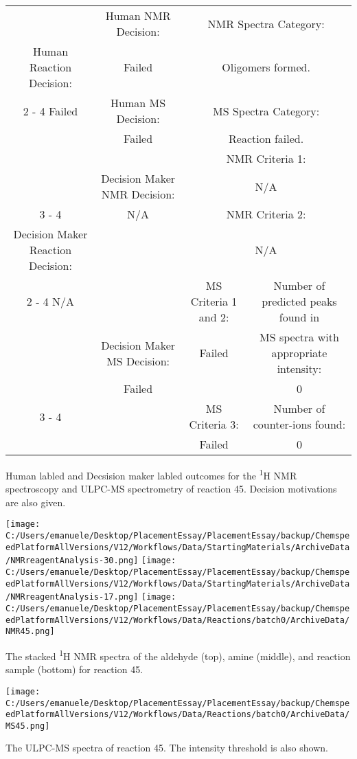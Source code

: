 \documentclass{article}%
\begin{document}
\begin{Decision Table}[H]%
\begin{tabular}{|c|c|c|c|}%
\hline%
&Human NMR Decision:&\multicolumn{2}{|c|}{NMR Spectra Category:}\\%
Human Reaction Decision:&Failed&\multicolumn{2}{|c|}{Oligomers formed.}\\%
\cline{2%
-%
4}%
Failed&Human MS Decision:&\multicolumn{2}{|c|}{MS Spectra Category:}\\%
&Failed&\multicolumn{2}{|c|}{Reaction failed.}\\%
\hline%
&&\multicolumn{2}{|c|}{NMR Criteria 1:}\\%
&Decision Maker NMR Decision:&\multicolumn{2}{|c|}{N/A}\\%
\cline{3%
-%
4}%
&N/A&\multicolumn{2}{|c|}{NMR Criteria 2:}\\%
Decision Maker Reaction Decision:&&\multicolumn{2}{|c|}{N/A}\\%
\cline{2%
-%
4}%
N/A&&MS Criteria 1 and 2:&Number of predicted peaks found in\\%
&Decision Maker MS Decision:&Failed&MS spectra with appropriate intensity:\\%
&Failed&&0\\%
\cline{3%
-%
4}%
&&MS Criteria 3:&Number of counter{-}ions found:\\%
&&Failed&0\\%
\hline%
\end{tabular}%
\caption{Human labled and Decsision maker labled outcomes for the \textsuperscript{1}H NMR spectroscopy and ULPC-MS spectrometry of reaction 45. Decision motivations are also given.}%
\end{Decision Table}%
\begin{NMR Spectra}[H]%
\begin{center}%
\texttt{[image: C:/Users/emanuele/Desktop/PlacementEssay/PlacementEssay/backup/ChemspeedPlatformAllVersions/V12/Workflows/Data/StartingMaterials/ArchiveData/NMRreagentAnalysis-30.png]}\hfill%
\texttt{[image: C:/Users/emanuele/Desktop/PlacementEssay/PlacementEssay/backup/ChemspeedPlatformAllVersions/V12/Workflows/Data/StartingMaterials/ArchiveData/NMRreagentAnalysis-17.png]}\hfill%
\texttt{[image: C:/Users/emanuele/Desktop/PlacementEssay/PlacementEssay/backup/ChemspeedPlatformAllVersions/V12/Workflows/Data/Reactions/batch0/ArchiveData/NMR45.png]}\hfill%
\end{center}%
\caption{The stacked \textsuperscript{1}H NMR spectra of the aldehyde (top), amine (middle), and reaction sample (bottom) for reaction 45.}%
\end{NMR Spectra}%
\begin{MS Spectra}[H]%
\begin{center}%
\texttt{[image: C:/Users/emanuele/Desktop/PlacementEssay/PlacementEssay/backup/ChemspeedPlatformAllVersions/V12/Workflows/Data/Reactions/batch0/ArchiveData/MS45.png]}\hfill%
\end{center}%
\caption{The ULPC-MS spectra of reaction 45. The intensity threshold is also shown.}%
\end{MS Spectra}%
\end{document}
